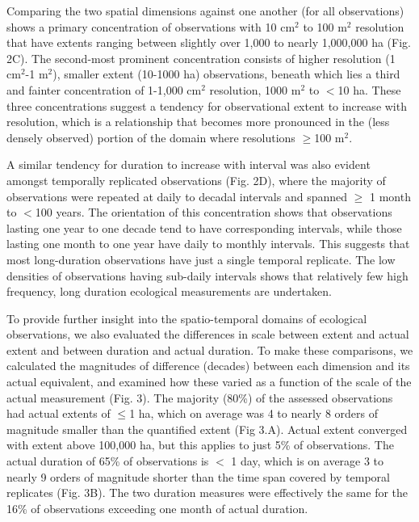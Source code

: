\documentclass[12pt]{article}
\begin{document}
Comparing the two spatial dimensions against one another (for all observations) shows a primary concentration of observations with 10 cm$^2$ to 100 m$^2$ resolution that have extents ranging between slightly over 1,000 to nearly 1,000,000 ha (Fig. 2C). The second-most prominent concentration consists of higher resolution (1 cm$^2$-1 m$^2$), smaller extent (10-1000 ha) observations, beneath which lies a third and fainter concentration of 1-1,000 cm$^2$ resolution, 1000 m$^2$ to $<$10 ha.  These three concentrations suggest a tendency for observational extent to increase with resolution, which is a relationship that becomes more pronounced in the (less densely observed) portion of the domain where resolutions $\geq$100 m$^2$.  

A similar tendency for duration to increase with interval was also evident amongst temporally replicated observations (Fig. 2D), where the majority of observations were repeated at daily to decadal intervals and spanned  $\geq$ 1 month to $<$100 years.  The orientation of this concentration shows that observations lasting one year to one decade tend to have corresponding intervals, while those lasting one month to one year have daily to monthly intervals. This suggests that most long-duration observations have just a single temporal replicate. The low densities of observations having sub-daily intervals shows that relatively few high frequency, long duration ecological measurements are undertaken.  

To provide further insight into the spatio-temporal domains of ecological observations, we also evaluated the differences in scale between extent and actual extent and between duration and actual duration. To make these comparisons, we calculated the magnitudes of difference (decades) between each dimension and its actual equivalent, and examined how these varied as a function of the scale of the actual measurement (Fig. 3). The majority (80\%) of the assessed observations had actual extents of $\leq$1 ha, which on average was 4 to nearly 8 orders of magnitude smaller than the quantified extent (Fig 3.A).  Actual extent converged with extent above 100,000 ha, but this applies to just 5\% of observations. The actual duration of 65\% of observations is $<$ 1 day, which is on average 3 to nearly 9 orders of magnitude shorter than the time span covered by temporal replicates (Fig. 3B). The two duration measures were effectively the same for the 16\% of observations exceeding one month of actual duration. 
\end{document}
